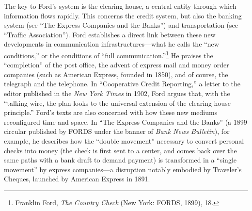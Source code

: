 \documentclass[openany,nobib]{tufte-book}
\begin{document}
The key to Ford's system is the clearing house, a central entity through
which information flows rapidly. This concerns the credit system, but
also the banking system (see ``The Express Companies and the Banks'')
and transportation (see ``Traffic Association''). Ford establishes a
direct link between these new developments in communication
infrastructures---what he calls the ``new conditions,'' or the
conditions of ``full communication.''\footnote{Franklin Ford, \emph{The
  Country Check} (New York: FORDS, 1899), 18.} He praises the
``completion'' of the post office, the advent of express mail and money
order companies (such as American Express, founded in 1850), and of
course, the telegraph and the telephone. In ``Cooperative Credit
Reporting,'' a letter to the editor published in the \emph{New York
Times} in 1902, Ford argues that, with the ``talking wire, the plan
looks to the universal extension of the clearing house principle.''
Ford's texts are also concerned with how these new mediums reconfigured
time and space. In ``The Express Companies and the Banks'' (a 1899
circular published by FORDS under the banner of \emph{Bank News
Bulletin}), for example, he describes how the ``double movement''
necessary to convert personal checks into money (the check is first sent
to a center, and comes back over the same paths with a bank draft to
demand payment) is transformed in a ``single movement'' by express
companies---a disruption notably embodied by Traveler's Cheques,
launched by American Express in 1891.
\end{document}
